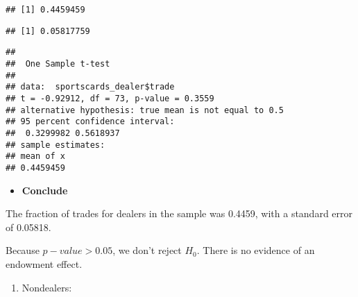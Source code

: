 \documentclass[
]{book}
\newenvironment{Shaded}{\begin{snugshade}}{\end{snugshade}}
\newcommand{\CommentTok}[1]{\textcolor[rgb]{0.56,0.35,0.01}{\textit{#1}}}
\newcommand{\DataTypeTok}[1]{\textcolor[rgb]{0.13,0.29,0.53}{#1}}
\newcommand{\FloatTok}[1]{\textcolor[rgb]{0.00,0.00,0.81}{#1}}
\newcommand{\KeywordTok}[1]{\textcolor[rgb]{0.13,0.29,0.53}{\textbf{#1}}}
\newcommand{\NormalTok}[1]{#1}
\newcommand{\OperatorTok}[1]{\textcolor[rgb]{0.81,0.36,0.00}{\textbf{#1}}}
\newcommand{\StringTok}[1]{\textcolor[rgb]{0.31,0.60,0.02}{#1}}
\providecommand{\tightlist}{%
  \setlength{\itemsep}{0pt}\setlength{\parskip}{0pt}}
\begin{document}
\begin{verbatim}
## [1] 0.4459459
\end{verbatim}

\begin{Shaded}
\end{Shaded}

\begin{verbatim}
## [1] 0.05817759
\end{verbatim}

\begin{Shaded}
\end{Shaded}

\begin{verbatim}
## 
##  One Sample t-test
## 
## data:  sportscards_dealer$trade
## t = -0.92912, df = 73, p-value = 0.3559
## alternative hypothesis: true mean is not equal to 0.5
## 95 percent confidence interval:
##  0.3299982 0.5618937
## sample estimates:
## mean of x 
## 0.4459459
\end{verbatim}

\begin{itemize}
\tightlist
\item
  \textbf{Conclude}
\end{itemize}

The fraction of trades for dealers in the sample was 0.4459, with a standard error of 0.05818.

Because \(p-value > 0.05\), we don't reject \(H_0\). There is no evidence of an endowment effect.

\begin{enumerate}
\def\labelenumi{\roman{enumi}.}
\setcounter{enumi}{1}
\tightlist
\item
  Nondealers:
\end{enumerate}
\end{document}
